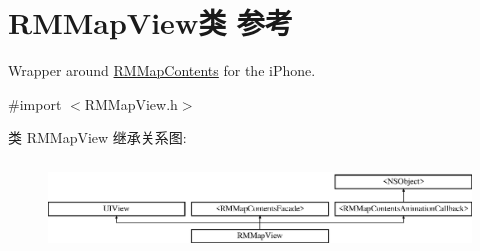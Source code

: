 \hypertarget{interface_r_m_map_view}{\section{R\-M\-Map\-View类 参考}
\label{interface_r_m_map_view}
}


Wrapper around \hyperlink{interface_r_m_map_contents}{R\-M\-Map\-Contents} for the i\-Phone.  




{\ttfamily \#import $<$R\-M\-Map\-View.\-h$>$}

类 R\-M\-Map\-View 继承关系图\-:\begin{figure}[H]
\begin{center}
\leavevmode
\includegraphics[height=2.424242cm]{interface_r_m_map_view}
\end{center}
\end{figure}
